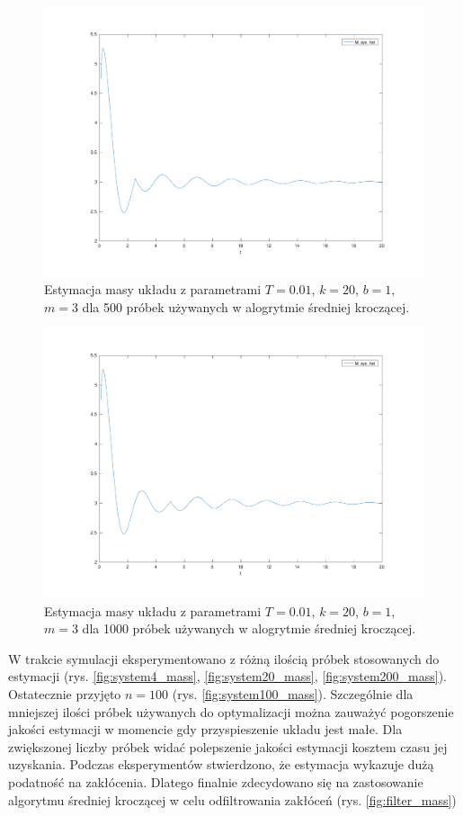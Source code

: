\documentclass[a4paper, 10pt]{article}
\begin{document}
\begin{figure}[H]
	\includegraphics[width=0.99\linewidth]{systemfs500_mass}
	\centering
	\caption{Estymacja masy układu z parametrami $T=0.01$, $k = 20$, $b = 1$, $m = 3$ dla 500 próbek używanych w alogrytmie średniej kroczącej.}
	\label{fig:systemfs500_mass}
\end{figure}


\begin{figure}[H]
	\includegraphics[width=0.99\linewidth]{systemfs1000_mass}
	\centering
	\caption{Estymacja masy układu z parametrami $T=0.01$, $k = 20$, $b = 1$, $m = 3$ dla 1000 próbek używanych w alogrytmie średniej kroczącej. }
	\label{fig:systemfs1000_mass}
\end{figure}



W trakcie symulacji eksperymentowano z różną ilością próbek stosowanych do estymacji (rys. \ref{fig:system4_mass}, \ref{fig:system20_mass}, \ref{fig:system200_mass}). Ostatecznie przyjęto $n = 100$ (rys. \ref{fig:system100_mass}). Szczególnie dla mniejszej ilości próbek używanych do optymalizacji można zauważyć pogorszenie jakości estymacji w momencie gdy przyspieszenie układu jest małe. Dla zwiększonej liczby próbek widać polepszenie jakości estymacji kosztem czasu jej uzyskania. Podczas eksperymentów stwierdzono, że estymacja wykazuje dużą podatność na zakłócenia. Dlatego finalnie zdecydowano się na zastosowanie algorytmu średniej kroczącej w celu odfiltrowania zakłóceń (rys. \ref{fig:filter_mass})
\end{document}
